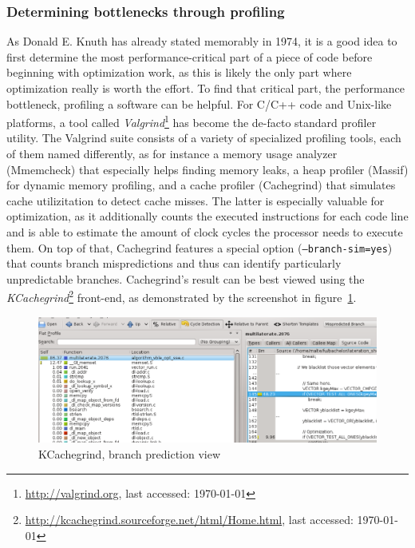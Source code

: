 \subsubsection{Determining bottlenecks through profiling}
As Donald E. Knuth has already stated memorably in 1974, it is a good idea to first determine the most performance-critical part of a piece of code before beginning with optimization work, as this is likely the only part where optimization really is worth the effort. To find that critical part, the performance bottleneck, profiling a software can be helpful. For C/C++ code and Unix-like platforms, a tool called \emph{Valgrind}\footnote{\url{http://valgrind.org}, last accessed: \today{}} has become the de-facto standard profiler utility. The Valgrind suite consists of a variety of specialized profiling tools, each of them named differently, as for instance a memory usage analyzer (Mmemcheck) that especially helps finding memory leaks, a heap profiler (Massif) for dynamic memory profiling, and a cache profiler (Cachegrind) that simulates cache utilizitation to detect cache misses. The latter is especially valuable for optimization, as it additionally counts the executed instructions for each code line and is able to estimate the amount of clock cycles the processor needs to execute them. On top of that, Cachegrind features a special option (\texttt{--branch-sim=yes}) that counts branch mispredictions and thus can identify particularly unpredictable branches. Cachegrind's result can be best viewed using the \emph{KCachegrind}\footnote{\url{http://kcachegrind.sourceforge.net/html/Home.html}, last accessed: \today{}} front-end, as demonstrated by the screenshot in figure~\ref{fig:kcachegrind}.
\begin{figure}[h]
\begin{center}
\includegraphics[width=14cm]{img/kcachegrind}
\end{center}
\caption{KCachegrind, branch prediction view}
\label{fig:kcachegrind}
\end{figure}

